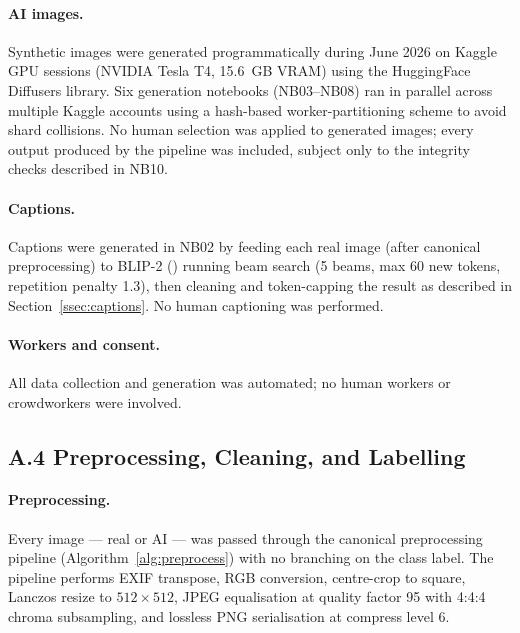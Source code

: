 \paragraph{AI images.}
Synthetic images were generated programmatically during June 2026
on Kaggle GPU sessions (NVIDIA Tesla T4, 15.6~GB VRAM) using the
HuggingFace Diffusers library.
Six generation notebooks (NB03--NB08) ran in parallel across multiple
Kaggle accounts using a hash-based worker-partitioning scheme to
avoid shard collisions.
No human selection was applied to generated images; every output
produced by the pipeline was included, subject only to the
integrity checks described in NB10.

\paragraph{Captions.}
Captions were generated in NB02 by feeding each real image (after
canonical preprocessing) to BLIP-2 ()
running beam search (5 beams, max 60 new tokens, repetition penalty
1.3), then cleaning and token-capping the result as described in
Section~\ref{ssec:captions}.
No human captioning was performed.

\paragraph{Workers and consent.}
All data collection and generation was automated; no human workers
or crowdworkers were involved.

\subsection*{A.4 \quad Preprocessing, Cleaning, and Labelling}
\label{ssec:ds_preprocessing}

\paragraph{Preprocessing.}
Every image — real or AI — was passed through the canonical
preprocessing pipeline (Algorithm~\ref{alg:preprocess}) with no
branching on the class label.
The pipeline performs EXIF transpose, RGB conversion, centre-crop to
square, Lanczos resize to $512 \times 512$, JPEG equalisation at
quality factor 95 with 4:4:4 chroma subsampling, and lossless PNG
serialisation at compress level 6.

